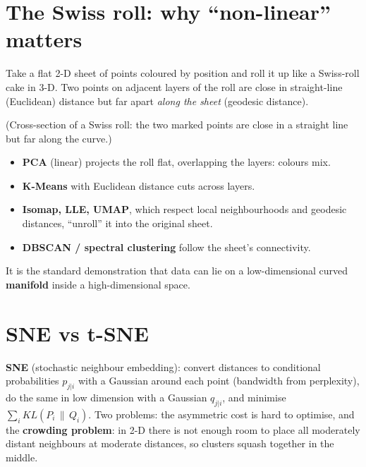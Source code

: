 \section{The Swiss roll: why ``non-linear'' matters}
Take a flat 2-D sheet of points coloured by position and roll it up like a Swiss-roll cake in 3-D. Two points on adjacent layers of the roll are close in straight-line
(Euclidean) distance but far apart \emph{along the sheet} (geodesic distance).
\begin{center}
\end{center}
(Cross-section of a Swiss roll: the two marked points are close in a straight line but far along the curve.)
\begin{itemize}
\item \textbf{PCA} (linear) projects the roll flat, overlapping the layers: colours mix.
\item \textbf{K-Means} with Euclidean distance cuts across layers.
\item \textbf{Isomap, LLE, UMAP}, which respect local neighbourhoods and geodesic distances, ``unroll'' it into the original sheet.
\item \textbf{DBSCAN / spectral clustering} follow the sheet's connectivity.
\end{itemize}
It is the standard demonstration that data can lie on a low-dimensional curved \textbf{manifold} inside a high-dimensional space.

\section{SNE vs t-SNE}
\textbf{SNE} (stochastic neighbour embedding): convert distances to conditional probabilities $p_{j|i}$ with a Gaussian around each point (bandwidth from perplexity), do the
same in low dimension with a Gaussian $q_{j|i}$, and minimise $\sum_i KL(P_i\,\|\,Q_i)$. Two problems: the asymmetric cost is hard to optimise, and the \textbf{crowding problem}:
in 2-D there is not enough room to place all moderately distant neighbours at moderate distances, so clusters squash together in the middle.

